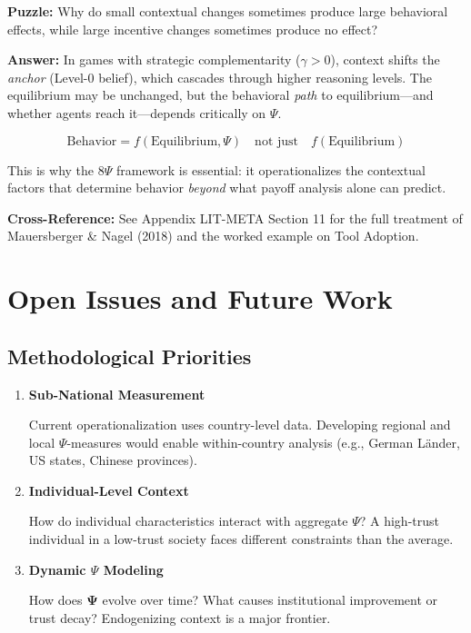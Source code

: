 \textbf{Puzzle:} Why do small contextual changes sometimes produce large behavioral effects,
while large incentive changes sometimes produce no effect?

\textbf{Answer:} In games with strategic complementarity ($\gamma > 0$), context shifts
the \textit{anchor} (Level-0 belief), which cascades through higher reasoning levels.
The equilibrium may be unchanged, but the behavioral \textit{path} to equilibrium---and
whether agents reach it---depends critically on $\Psi$.

\begin{equation}
\text{Behavior} = f(\text{Equilibrium}, \Psi) \quad \text{not just} \quad f(\text{Equilibrium})
\tag{V-DESIGN}
\end{equation}

This is why the 8$\Psi$ framework is essential: it operationalizes the contextual factors
that determine behavior \textit{beyond} what payoff analysis alone can predict.

\textbf{Cross-Reference:} See Appendix LIT-META Section 11 for the full treatment of
Mauersberger \& Nagel (2018) and the worked example on Tool Adoption.


\section{Open Issues and Future Work}
\label{sec:V-open}

\subsection{Methodological Priorities}

\begin{enumerate}
    \item \textbf{Sub-National Measurement}
    
    Current operationalization uses country-level data. Developing regional 
    and local $\Psi$-measures would enable within-country analysis (e.g., 
    German Länder, US states, Chinese provinces).
    
    \item \textbf{Individual-Level Context}
    
    How do individual characteristics interact with aggregate $\Psi$? 
    A high-trust individual in a low-trust society faces different constraints 
    than the average.
    
    \item \textbf{Dynamic $\Psi$ Modeling}
    
    How does $\boldsymbol{\Psi}$ evolve over time? What causes institutional 
    improvement or trust decay? Endogenizing context is a major frontier.
\end{enumerate}

